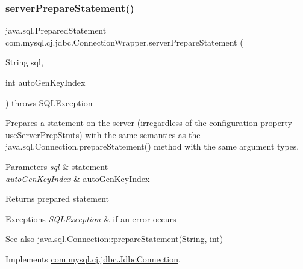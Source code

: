 \subsubsection{\texorpdfstring{server\+Prepare\+Statement()}{serverPrepareStatement()}\hspace{0.1cm}{\footnotesize\ttfamily [2/6]}}
{\footnotesize\ttfamily java.\+sql.\+Prepared\+Statement com.\+mysql.\+cj.\+jdbc.\+Connection\+Wrapper.\+server\+Prepare\+Statement (\begin{DoxyParamCaption}\item[{String}]{sql,  }\item[{int}]{auto\+Gen\+Key\+Index }\end{DoxyParamCaption}) throws S\+Q\+L\+Exception}

Prepares a statement on the server (irregardless of the configuration property \textquotesingle{}use\+Server\+Prep\+Stmts\textquotesingle{}) with the same semantics as the java.\+sql.\+Connection.\+prepare\+Statement() method with the same argument types.


\begin{DoxyParams}{Parameters}
{\em sql} & statement \\
\hline
{\em auto\+Gen\+Key\+Index} & auto\+Gen\+Key\+Index \\
\hline
\end{DoxyParams}
\begin{DoxyReturn}{Returns}
prepared statement 
\end{DoxyReturn}

\begin{DoxyExceptions}{Exceptions}
{\em S\+Q\+L\+Exception} & if an error occurs \\
\hline
\end{DoxyExceptions}
\begin{DoxySeeAlso}{See also}
java.\+sql.\+Connection\+::prepare\+Statement(\+String, int) 
\end{DoxySeeAlso}


Implements \mbox{\hyperlink{interfacecom_1_1mysql_1_1cj_1_1jdbc_1_1_jdbc_connection_a9deb2cebf6538a53be5f24c52ee39f22}{com.\+mysql.\+cj.\+jdbc.\+Jdbc\+Connection}}.

\mbox{\label{classcom_1_1mysql_1_1cj_1_1jdbc_1_1_connection_wrapper_a764bc7940c1fb384724ba3bc18572978}} 
